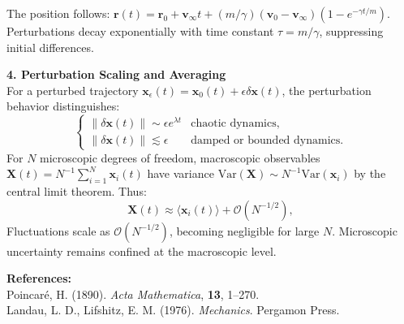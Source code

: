 \begin{technical}
The position follows: $\mathbf{r}(t) = \mathbf{r}_0 + \mathbf{v}_\infty t + (m/\gamma)(\mathbf{v}_0 - \mathbf{v}_\infty)(1 - e^{-\gamma t/m})$. Perturbations decay exponentially with time constant $\tau = m/\gamma$, suppressing initial differences.

\textbf{4. Perturbation Scaling and Averaging}\\
For a perturbed trajectory $\mathbf{x}_\epsilon(t) = \mathbf{x}_0(t) + \epsilon \delta \mathbf{x}(t)$, the perturbation behavior distinguishes:
\[
\begin{cases}
\|\delta \mathbf{x}(t)\| \sim \epsilon e^{\lambda t} & \text{chaotic dynamics,} \\[0.5em]
\|\delta \mathbf{x}(t)\| \lesssim \epsilon & \text{damped or bounded dynamics.}
\end{cases}
\]
For $N$ microscopic degrees of freedom, macroscopic observables $\mathbf{X}(t) = N^{-1} \sum_{i=1}^N \mathbf{x}_i(t)$ have variance $\mathrm{Var}(\mathbf{X}) \sim N^{-1} \mathrm{Var}(\mathbf{x}_i)$ by the central limit theorem. Thus:
\[
\mathbf{X}(t) \approx \langle \mathbf{x}_i(t) \rangle + \mathcal{O}(N^{-1/2}),
\]
Fluctuations scale as $\mathcal{O}(N^{-1/2})$, becoming negligible for large $N$. Microscopic uncertainty remains confined at the macroscopic level.

\textbf{References:}\\
Poincaré, H. (1890). \emph{Acta Mathematica}, \textbf{13}, 1–270.\\
Landau, L. D., Lifshitz, E. M. (1976). \emph{Mechanics}. Pergamon Press.
\end{technical}
